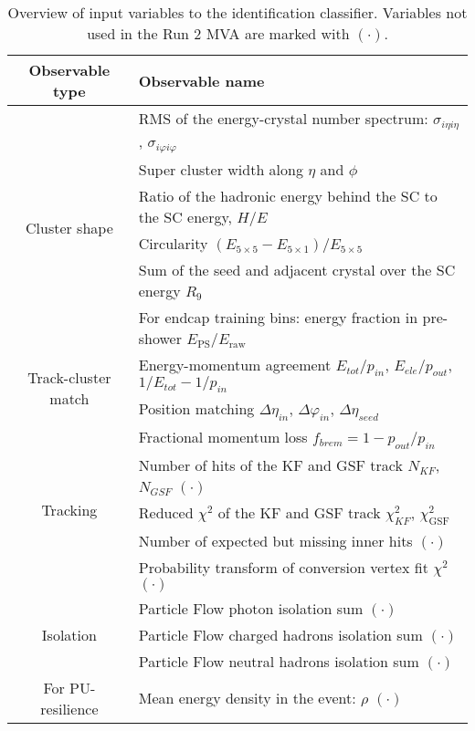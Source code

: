 \begin{table}[ht]
  \caption{Overview of input variables to the identification classifier. Variables not used in the Run 2 MVA are marked with  $(\mathord{\cdot})$.}
  \label{tab:ele_ID_input_variables}
  \small
  \centering
  \begin{tabular}{c l}
    \toprule
    Observable type & Observable name \\
    \midrule
    \multirow{6}{*}{Cluster shape}
      & RMS of the energy-crystal number spectrum: $\sigma_{i\eta i\eta}$, $\sigma_{i\varphi i\varphi}$ \\
      & Super cluster width along $\eta$ and $\phi$ \\
      & Ratio of the hadronic energy behind the SC to the SC energy, $H/E$ \\
      & Circularity $(E_{5\times5} - E_{5\times1})/E_{5\times5}$ \\
      & Sum of the seed and adjacent crystal over the SC energy $R_{9}$ \\
      & For endcap training bins: energy fraction in pre-shower $E_\text{PS}/E_\text{raw}$ \\
    \hline
    \multirow{2}{*}{Track-cluster match}
      & Energy-momentum agreement $E_{tot}/p_{in}$, $E_{ele}/p_{out}$, $1/E_{tot} - 1/p_{in}$ \\
      & Position matching $\Delta\eta_{in}$, $\Delta\varphi_{in}$, $\Delta\eta_{seed}$ \\
    \hline
    \multirow{5}{*}{Tracking}
      & Fractional momentum loss $f_{brem} = 1 - p_{out}/p_{in}$ \\
      & Number of hits of the KF and GSF track $N_{KF}$, $N_{GSF}$ $(\mathord{\cdot})$ \\
      & Reduced $\chi^2$ of the KF and GSF track $\chi^{2}_{KF}$, $\chi^{2}_{\textrm{GSF}}$ \\
      & Number of expected but missing inner hits $(\mathord{\cdot})$ \\
      & Probability transform of conversion vertex fit $\chi^2$ $(\mathord{\cdot})$ \\
    \hline
    \multirow{3}{*}{Isolation}
      & Particle Flow photon isolation sum $(\mathord{\cdot})$ \\
      & Particle Flow charged hadrons isolation sum $(\mathord{\cdot})$ \\
      & Particle Flow neutral hadrons isolation sum $(\mathord{\cdot})$ \\
    \hline
    \multirow{1}{*}{For PU-resilience}
      & Mean energy density in the event: $\rho$ $(\mathord{\cdot})$ \\
    \bottomrule
  \end{tabular}
\end{table}


